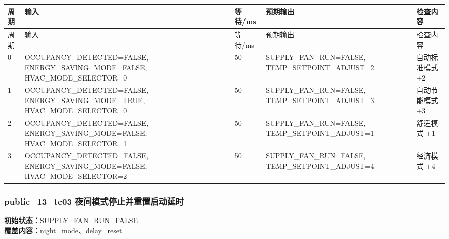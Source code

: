 \begin{longtable}{L{1.0cm}L{4.7cm}L{1.4cm}L{4.0cm}L{2.1cm}}

\toprule

周期 & 输入 & 等待/ms & 预期输出 & 检查内容\\

\midrule

\endfirsthead

\toprule

周期 & 输入 & 等待/ms & 预期输出 & 检查内容\\

\midrule

\endhead

0 & OCCUPANCY\_DETECTED=FALSE, ENERGY\_SAVING\_MODE=FALSE, HVAC\_MODE\_SELECTOR=0 & 50 & SUPPLY\_FAN\_RUN=FALSE, TEMP\_SETPOINT\_ADJUST=2 & 自动标准模式 +2\\

1 & OCCUPANCY\_DETECTED=FALSE, ENERGY\_SAVING\_MODE=TRUE, HVAC\_MODE\_SELECTOR=0 & 50 & SUPPLY\_FAN\_RUN=FALSE, TEMP\_SETPOINT\_ADJUST=3 & 自动节能模式 +3\\

2 & OCCUPANCY\_DETECTED=FALSE, ENERGY\_SAVING\_MODE=FALSE, HVAC\_MODE\_SELECTOR=1 & 50 & SUPPLY\_FAN\_RUN=FALSE, TEMP\_SETPOINT\_ADJUST=1 & 舒适模式 +1\\

3 & OCCUPANCY\_DETECTED=FALSE, ENERGY\_SAVING\_MODE=FALSE, HVAC\_MODE\_SELECTOR=2 & 50 & SUPPLY\_FAN\_RUN=FALSE, TEMP\_SETPOINT\_ADJUST=4 & 经济模式 +4\\

\bottomrule

\end{longtable}

\subsubsection{{\ttfamily public\_13\_tc03} 夜间模式停止并重置启动延时}

\noindent\textbf{初始状态：}SUPPLY\_FAN\_RUN=FALSE\\

\textbf{覆盖内容：}night\_mode、delay\_reset


